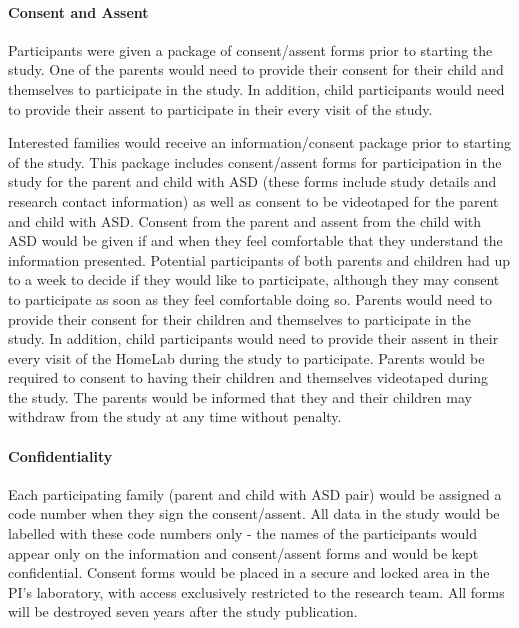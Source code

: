 \documentclass{ut-thesis}
\begin{document}
\paragraph{Consent and Assent}
Participants were given a package of consent/assent forms prior to starting the study. One of the parents would need to provide their consent for their child and themselves to participate in the study. In addition, child participants would need to provide their assent to participate in their every visit of the study. 

Interested families would receive an information/consent package prior to starting of the study. This package includes consent/assent forms for participation in the study for the parent and child with ASD (these forms include study details and research contact information) as well as consent to be videotaped for the parent and child with ASD. Consent from the parent and assent from the child with ASD would be given if and when they feel comfortable that they understand the information presented. Potential participants of both parents and children had up to a week to decide if they would like to participate, although they may consent to participate as soon as they feel comfortable doing so. Parents would need to provide their consent for their children and themselves to participate in the study. In addition, child participants would need to provide their assent in their every visit of the HomeLab during the study to participate. Parents would be required to consent to having their children and themselves videotaped during the study. The parents would be informed that they and their children may withdraw from the study at any time without penalty.

\paragraph{Confidentiality}
Each participating family (parent and child with ASD pair) would be assigned a code number when they sign the consent/assent. All data in the study would be labelled with these code numbers only - the names of the participants would appear only on the information and consent/assent forms and would be kept confidential. Consent forms would be placed in a secure and locked area in the PI's laboratory, with access exclusively restricted to the research team. All forms will be destroyed seven years after the study publication. 
\end{document}
